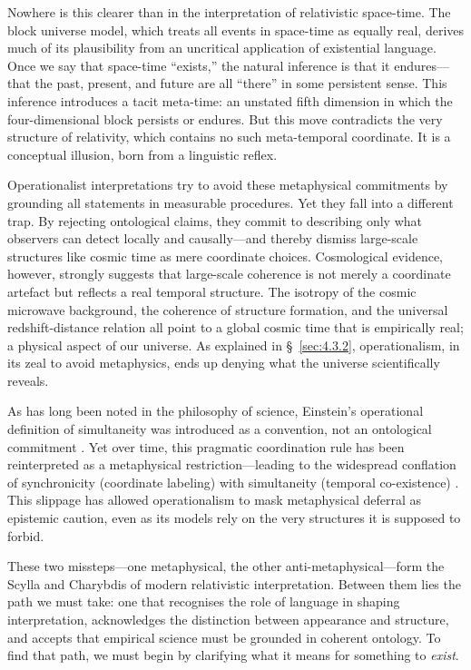 \documentclass[12pt]{book}
\begin{document}
Nowhere is this clearer than in the interpretation of relativistic space-time. The block universe model, which treats all events in space-time as equally real, derives much of its plausibility from an uncritical application of existential language. Once we say that space-time ``exists,'' the natural inference is that it endures---that the past, present, and future are all ``there'' in some persistent sense. This inference introduces a tacit meta-time: an unstated fifth dimension in which the four-dimensional block persists or endures. But this move contradicts the very structure of relativity, which contains no such meta-temporal coordinate. It is a conceptual illusion, born from a linguistic reflex.

Operationalist interpretations try to avoid these metaphysical commitments by grounding all statements in measurable procedures. Yet they fall into a different trap. By rejecting ontological claims, they commit to describing only what observers can detect locally and causally---and thereby dismiss large-scale structures like cosmic time as mere coordinate choices. Cosmological evidence, however, strongly suggests that large-scale coherence is not merely a coordinate artefact but reflects a real temporal structure. The isotropy of the cosmic microwave background, the coherence of structure formation, and the universal redshift-distance relation all point to a global cosmic time that is empirically real; a physical aspect of our universe. As explained in \S~\ref{sec:4.3.2}, operationalism, in its zeal to avoid metaphysics, ends up denying what the universe scientifically reveals.

As has long been noted in the philosophy of science, Einstein's operational definition of simultaneity was introduced as a convention, not an ontological commitment \citep{reichenbach1958, Stein1968}. Yet over time, this pragmatic coordination rule has been reinterpreted as a metaphysical restriction---leading to the widespread conflation of synchronicity (coordinate labeling) with simultaneity (temporal co-existence) \citep[see also][]{Brown2005}. This slippage has allowed operationalism to mask metaphysical deferral as epistemic caution, even as its models rely on the very structures it is supposed to forbid.

These two missteps---one metaphysical, the other anti-metaphysical---form the Scylla and Charybdis of modern relativistic interpretation. Between them lies the path we must take: one that recognises the role of language in shaping interpretation, acknowledges the distinction between appearance and structure, and accepts that empirical science must be grounded in coherent ontology. To find that path, we must begin by clarifying what it means for something to \textit{exist}.
\end{document}
